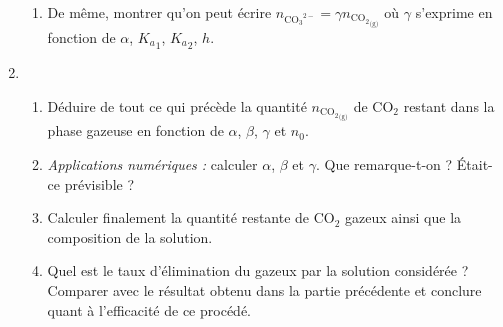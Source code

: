 \documentclass[a4paper,french,bookmarks]{article}
\begin{document}
\begin{enumerate}
\begin{enumerate}
            \item De même, montrer qu'on peut écrire $n_{{\mathrm C\mathrm O_3}^{2-}} = \gamma n_{{\mathrm C\mathrm O_2}_\text{(g)}}$ où $\gamma$ s'exprime en fonction de $\alpha$, ${K_a}_1$, ${K_a}_2$, $h$.
            
        \end{enumerate}
        
        \item \begin{enumerate}
            \item Déduire de tout ce qui précède la quantité $n_{{\mathrm C\mathrm O_2}_\text{(g)}}$ de $\mathrm C\mathrm O_2$ restant dans la phase gazeuse en fonction de $\alpha$, $\beta$, $\gamma$ et $n_0$.
            
            
            \item \emph{Applications numériques :} calculer $\alpha$, $\beta$ et $\gamma$. Que remarque-t-on ? Était-ce prévisible ?
            
            
            \item Calculer finalement la quantité restante de $\mathrm C\mathrm O_2$ gazeux ainsi que la composition de la solution.
            
            
            \item Quel est le taux d’élimination du gazeux par la solution considérée ? Comparer avec le résultat obtenu dans la partie précédente et conclure quant à l’efficacité de ce procédé.
            
        \end{enumerate}
    \end{enumerate}
    
\end{document}
